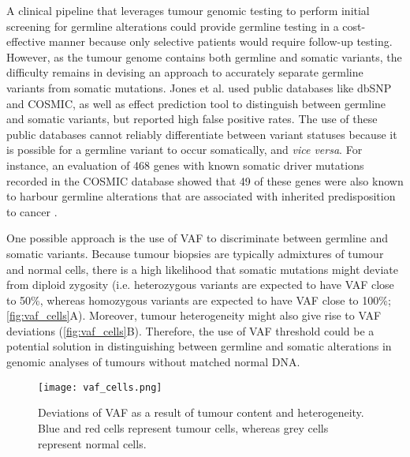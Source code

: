 A clinical pipeline that leverages tumour genomic testing to perform initial screening for germline alterations could provide germline testing in a cost-effective manner because only selective patients would require follow-up testing. However, as the tumour genome contains both germline and somatic variants, the difficulty remains in devising an approach to accurately separate germline variants from somatic mutations. Jones et al. \cite{Jones2015a} used public databases like \acs{dbSNP} and \acs{COSMIC}, as well as effect prediction tool to distinguish between germline and somatic variants, but reported high false positive rates. The use of these public databases cannot reliably differentiate between variant statuses because it is possible for a germline variant to occur somatically, and \textit{vice versa}. For instance, an evaluation of 468 genes with known somatic driver mutations recorded in the COSMIC database showed that 49 of these genes were also known to harbour germline alterations that are associated with inherited predisposition to cancer \cite{Rahman2014}.

One possible approach is the use of VAF to discriminate between germline and somatic variants. Because tumour biopsies are typically admixtures of tumour and normal cells, there is a high likelihood that somatic mutations might deviate from diploid zygosity (i.e. heterozygous variants are expected to have VAF close to 50\%, whereas homozygous variants are expected to have VAF close to 100\%; \autoref{fig:vaf_cells}A). Moreover, tumour heterogeneity might also give rise to VAF deviations (\autoref{fig:vaf_cells}B). Therefore, the use of VAF threshold could be a potential solution in distinguishing between germline and somatic alterations in genomic analyses of tumours without matched normal DNA.


\begin{figure}[H]
	\centering
	\texttt{[image: vaf\_cells.png]}
	\caption[Deviations of VAF as a result of tumour content and heterogeneity.]{Deviations of VAF as a result of tumour content and heterogeneity. Blue and red cells represent tumour cells, whereas grey cells represent normal cells.}
	\label{fig:vaf_cells}
\end{figure}



